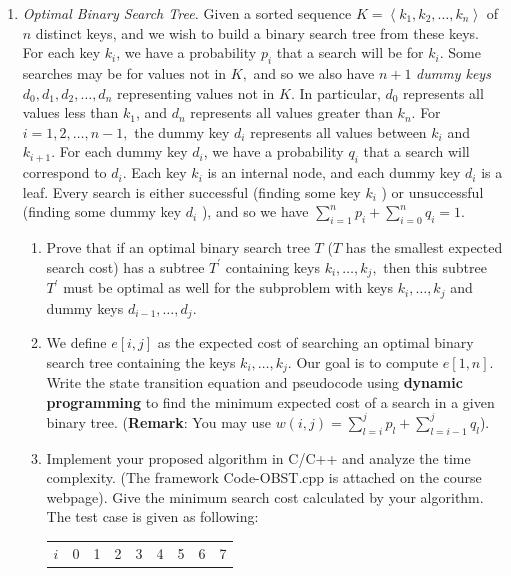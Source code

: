 \documentclass[12pt,a4paper]{article}
\theoremstyle{definition}
\begin{document}
	\begin{enumerate}
		\item \textit{Optimal Binary Search Tree.} Given a sorted sequence $K=\left \langle k_{1}, k_{2}, \ldots, k_{n} \right \rangle$ of $n$ distinct keys, and we wish to build a binary search tree from these keys. For each key $k_{i}$, we have a probability $p_{i}$ that a search will be for $k_{i}$. Some searches may be for values not in $K,$ and so we also have $n+1$ \emph{dummy keys} $d_{0}, d_{1}, d_{2}, \ldots, d_{n}$ representing values not in $K$. In particular, $d_{0}$ represents all values less than $k_{1}$, and $d_{n}$ represents all values greater than $k_{n}$. For $i=1,2, \ldots, n-1,$ the dummy key $d_{i}$ represents all values between $k_{i}$ and $k_{i+1}$. For each dummy key $d_{i}$, we have a probability $q_{i}$ that a search will correspond to $d_{i}$. Each key $k_{i}$ is an internal node, and each dummy key $d_{i}$ is a leaf. Every search is either successful (finding some key $k_{i}$ ) or unsuccessful (finding some dummy key $d_{i}$ ), and so we have $ \sum_{i=1}^{n} p_{i}+\sum_{i=0}^{n} q_{i}=1 $. 
		\begin{enumerate}
			\item Prove that if an optimal binary search tree $T$ ($ T $ has the smallest expected search cost) has a subtree $T^{\prime}$ containing keys $k_{i}, \ldots, k_{j},$ then this subtree $T^{\prime}$ must be optimal as well for the subproblem with keys $k_{i}, \ldots, k_{j}$ and dummy keys $d_{i-1}, \ldots, d_{j}$. 
			\item We define $e[i, j]$ as the expected cost of searching an optimal binary search tree containing the keys $k_{i}, \ldots, k_{j} .$ Our goal is to compute $e[1, n]$. Write the state transition equation and pseudocode using \textbf{dynamic programming} to find
			the minimum expected cost of a search in a given binary tree. (\textbf{Remark}: You may use $ w(i, j)=\sum_{l=i}^{j} p_{l}+\sum_{l=i-1}^{j} q_{l} $).
			\item Implement your proposed algorithm in C/C++ and analyze the time complexity. ({\color{blue}The framework Code-OBST.cpp is attached on the course webpage}). Give the minimum search cost calculated by your algorithm. The test case is given as following:
			\begin{table}[H]
				\setlength{\abovecaptionskip}{0cm}
				\setlength{\belowcaptionskip}{0.1cm}
				\centering		
				\begin{tabular}{|c|cccccccc|}
					\hline
					$ i $&0&1&2&3&4&5&6&7\\

\end{tabular}
\end{table}
\end{enumerate}
\end{enumerate}
\end{document}
